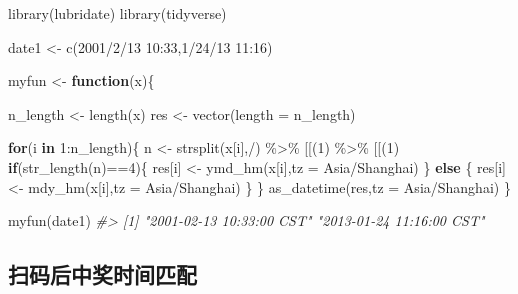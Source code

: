 \documentclass[
]{book}
\newenvironment{Shaded}{\begin{snugshade}}{\end{snugshade}}
\newcommand{\AttributeTok}[1]{\textcolor[rgb]{0.77,0.63,0.00}{#1}}
\newcommand{\CommentTok}[1]{\textcolor[rgb]{0.56,0.35,0.01}{\textit{#1}}}
\newcommand{\ControlFlowTok}[1]{\textcolor[rgb]{0.13,0.29,0.53}{\textbf{#1}}}
\newcommand{\DecValTok}[1]{\textcolor[rgb]{0.00,0.00,0.81}{#1}}
\newcommand{\FunctionTok}[1]{\textcolor[rgb]{0.00,0.00,0.00}{#1}}
\newcommand{\NormalTok}[1]{#1}
\newcommand{\OtherTok}[1]{\textcolor[rgb]{0.56,0.35,0.01}{#1}}
\newcommand{\SpecialCharTok}[1]{\textcolor[rgb]{0.00,0.00,0.00}{#1}}
\newcommand{\StringTok}[1]{\textcolor[rgb]{0.31,0.60,0.02}{#1}}
\begin{document}
\begin{Shaded}
\begin{Highlighting}[]

\FunctionTok{library}\NormalTok{(lubridate)}
\FunctionTok{library}\NormalTok{(tidyverse)}

\NormalTok{date1 }\OtherTok{\textless{}{-}} \FunctionTok{c}\NormalTok{(}\StringTok{\textquotesingle{}2001/2/13 10:33\textquotesingle{}}\NormalTok{,}\StringTok{\textquotesingle{}1/24/13 11:16\textquotesingle{}}\NormalTok{)}

\NormalTok{myfun }\OtherTok{\textless{}{-}} \ControlFlowTok{function}\NormalTok{(x)\{}
  
\NormalTok{  n\_length }\OtherTok{\textless{}{-}} \FunctionTok{length}\NormalTok{(x)}
\NormalTok{  res }\OtherTok{\textless{}{-}} \FunctionTok{vector}\NormalTok{(}\AttributeTok{length =}\NormalTok{ n\_length)}
  
  \ControlFlowTok{for}\NormalTok{(i }\ControlFlowTok{in} \DecValTok{1}\SpecialCharTok{:}\NormalTok{n\_length)\{}
\NormalTok{    n }\OtherTok{\textless{}{-}} \FunctionTok{strsplit}\NormalTok{(x[i],}\StringTok{\textquotesingle{}/\textquotesingle{}}\NormalTok{) }\SpecialCharTok{\%\textgreater{}\%} \StringTok{\textasciigrave{}}\AttributeTok{[[}\StringTok{\textasciigrave{}}\NormalTok{(}\DecValTok{1}\NormalTok{) }\SpecialCharTok{\%\textgreater{}\%} \StringTok{\textasciigrave{}}\AttributeTok{[[}\StringTok{\textasciigrave{}}\NormalTok{(}\DecValTok{1}\NormalTok{)}
    \ControlFlowTok{if}\NormalTok{(}\FunctionTok{str\_length}\NormalTok{(n)}\SpecialCharTok{==}\DecValTok{4}\NormalTok{)\{}
\NormalTok{      res[i] }\OtherTok{\textless{}{-}} \FunctionTok{ymd\_hm}\NormalTok{(x[i],}\AttributeTok{tz =} \StringTok{\textquotesingle{}Asia/Shanghai\textquotesingle{}}\NormalTok{)}
\NormalTok{    \} }\ControlFlowTok{else}\NormalTok{ \{}
\NormalTok{      res[i] }\OtherTok{\textless{}{-}} \FunctionTok{mdy\_hm}\NormalTok{(x[i],}\AttributeTok{tz =} \StringTok{\textquotesingle{}Asia/Shanghai\textquotesingle{}}\NormalTok{)}
\NormalTok{    \}}
\NormalTok{  \}}
  \FunctionTok{as\_datetime}\NormalTok{(res,}\AttributeTok{tz =} \StringTok{\textquotesingle{}Asia/Shanghai\textquotesingle{}}\NormalTok{)}
\NormalTok{\}}

\FunctionTok{myfun}\NormalTok{(date1)}
\CommentTok{\#\textgreater{} [1] "2001{-}02{-}13 10:33:00 CST" "2013{-}01{-}24 11:16:00 CST"}
\end{Highlighting}
\end{Shaded}

\hypertarget{ux626bux7801ux540eux4e2dux5956ux65f6ux95f4ux5339ux914d}{%
\subsection{扫码后中奖时间匹配}\label{ux626bux7801ux540eux4e2dux5956ux65f6ux95f4ux5339ux914d}}
\end{document}

